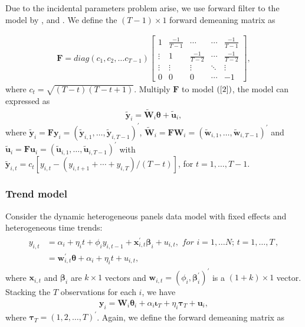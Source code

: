 \documentclass[12pt,a4paper,hyperref]{article}
\begin{document}
Due to the incidental parameters problem arise, we use forward filter to the model by \citet{Moon:2000}, \citet{Hayakawa:2009} and \citet{Hayakawa:2019}. We define the $\left(T-1 \right) \times 1$ forward demeaning matrix as

\begin{align}
\boldsymbol{F}=diag(c_{1}, c_{2}, \ldots c_{T-1})
\begin{bmatrix}
1 & \frac{-1}{T-1} & \cdots & \cdots & \frac{-1}{T-1}\\
\vdots & 1 & \frac{-1}{T-2} & \cdots & \frac{-1}{T-2}\\
\vdots & \vdots & \vdots & \ddots & \vdots \\
0 & 0 & 0 & \cdots & -1 
\end{bmatrix},
\end{align}    
where $c_{t}=\sqrt{\left( T-t\right)\left( T-t+1\right) }$.
Multiply $\boldsymbol{F}$ to model $(\ref{2})$, the model can expressed as  
\begin{align}
\tilde{\boldsymbol{y}}_{i}= \tilde{\boldsymbol{W}}_{i}\boldsymbol{\theta}+\tilde{\boldsymbol{u}}_{i},
\end{align}
where $\tilde{\boldsymbol{y}}_{i}=\boldsymbol{F}\boldsymbol{y}_{i}= \left(\tilde{\boldsymbol{y}}_{i,1}, \ldots, \tilde{\boldsymbol{y}}_{i,T-1} \right)^{'}$,  $\tilde{\boldsymbol{W}}_{i}=\boldsymbol{F}\boldsymbol{W}_{i}= \left(\tilde{\boldsymbol{w}}_{i,1}, \ldots, \tilde{\boldsymbol{w}}_{i,T-1} \right)^{'}$ and $\tilde{\boldsymbol{u}}_{i}=\boldsymbol{F}\boldsymbol{u}_{i}= \left(\tilde{\boldsymbol{u}}_{i,1}, \ldots, \tilde{\boldsymbol{u}}_{i,T-1} \right)^{'}$ with $\tilde{\boldsymbol{y}}_{i,t}=c_{t}\left[y_{i,t}-\left(y_{i,t+1}+\cdots+y_{i,T} \right)/\left(T-t \right) \right]$, for $t=1, \ldots, T-1.$


\subsubsection{Trend model}
Consider the dynamic heterogeneous panels data model with fixed effects and heterogeneous time trends:
\begin{align}
\begin{split}
y_{i,t}&=\alpha_{i}+\eta_{i}t +\phi_{i} y_{i,t-1}+ \boldsymbol{x}^{'}_{i,t}\boldsymbol{\beta}_{i}+u_{i,t}, \,\, for\,\,i=1,\ldots N;\,t=1,\ldots,T\, , \\
&= \boldsymbol{w}^{'}_{i,t}\boldsymbol{\theta}+ \alpha_{i}+\eta_{i}t+u_{i,t}, 
\end{split}
\end{align}
where $\boldsymbol{x}_{i,t}$ and $\boldsymbol{\beta}_{i}$ are $k \times 1$ vectors and $\boldsymbol{w}_{i,t}=\left(\phi_{i}, \boldsymbol{\beta}^{'}_{i} \right)^{'}$ is a $\left(1+k\right) \times 1$ vector.
Stacking the $T$ observations for each $i$, we have
\begin{align}
\boldsymbol{y}_{i}=\boldsymbol{W}_{i}\boldsymbol{\theta}_{i}+ \alpha_{i}\boldsymbol{\iota}_{T}+\eta_{i}\boldsymbol{\tau}_{T} + \boldsymbol{u}_{i}, \label{6}
\end{align}
where $\boldsymbol{\tau}_{T}=\left(1, 2, \ldots, T \right)^{'}$. Again, we define the forward demeaning matrix as
\end{document}
